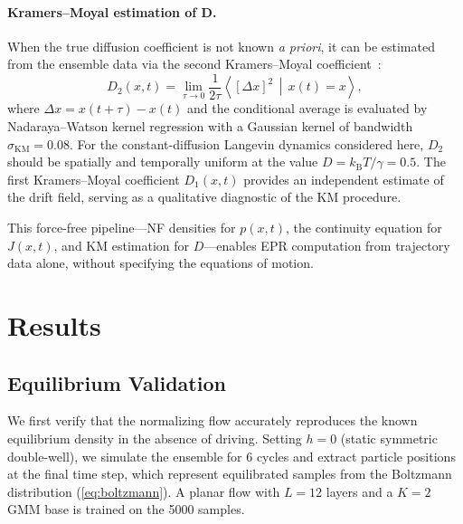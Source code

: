 \paragraph{Kramers--Moyal estimation of D.}
When the true diffusion coefficient is not known \emph{a priori}, it can be estimated from the ensemble data via the second Kramers--Moyal coefficient~\cite{Kramers1940,Gorjao2021}:
\begin{equation}
    D_2(x,t) = \lim_{\tau \to 0}\frac{1}{2\tau}\left\langle\left[\Delta x\right]^2\,\middle|\, x(t) = x\right\rangle,
    \label{eq:km_D2}
\end{equation}
where $\Delta x = x(t+\tau) - x(t)$ and the conditional average is evaluated by Nadaraya--Watson kernel regression with a Gaussian kernel of bandwidth $\sigma_{\mathrm{KM}} = \num{0.08}$.
For the constant-diffusion Langevin dynamics considered here, $D_2$ should be spatially and temporally uniform at the value $D = k_{\mathrm{B}}T/\gamma = \num{0.5}$.
The first Kramers--Moyal coefficient $D_1(x,t)$ provides an independent estimate of the drift field, serving as a qualitative diagnostic of the KM procedure.

This force-free pipeline---NF densities for $p(x,t)$, the continuity equation for $J(x,t)$, and KM estimation for $D$---enables EPR computation from trajectory data alone, without specifying the equations of motion.


\section{Results}
\label{sec:results}

\subsection{Equilibrium Validation}
\label{sec:results_equilibrium}

We first verify that the normalizing flow accurately reproduces the known equilibrium density in the absence of driving.
Setting $h = 0$ (static symmetric double-well), we simulate the ensemble for $\num{6}$ cycles and extract particle positions at the final time step, which represent equilibrated samples from the Boltzmann distribution (\cref{eq:boltzmann}).
A planar flow with $L = 12$ layers and a $K = 2$ GMM base is trained on the \num{5000} samples.

